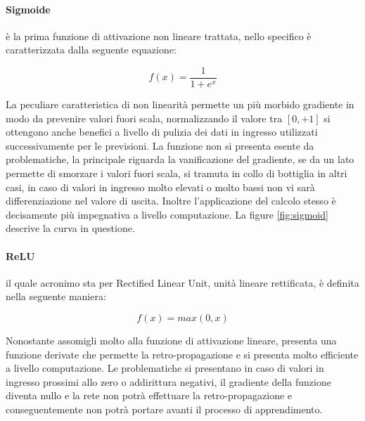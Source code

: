 \documentclass[%
    corpo=12pt,
    twoside,
    oldstyle,
    autoretitolo,
    greek,
    evenboxes,
]{toptesi}
\begin{document}
\paragraph{Sigmoide} è la prima funzione di attivazione non lineare trattata, nello specifico è caratterizzata dalla seguente equazione:
\begin{center}
  \begin{equation}
    f(x) = \frac{1}{1+e^{x}}
  \end{equation}
\end{center}
La peculiare caratteristica di non linearità permette un più morbido gradiente in modo da prevenire valori fuori scala, normalizzando il valore tra $[0, +1]$ si ottengono anche benefici a livello di pulizia dei dati in ingresso utilizzati successivamente per le previsioni. La funzione non si presenta esente da problematiche, la principale riguarda la vanificazione del gradiente, se da un lato permette di smorzare i valori fuori scala, si tramuta in collo di bottiglia in altri casi, in caso di valori in ingresso molto elevati o molto bassi non vi sarà differenziazione nel valore di uscita. Inoltre l'applicazione del calcolo stesso è decisamente più impegnativa a livello computazione. La figure \ref{fig:sigmoid} descrive la curva in questione.

\paragraph{ReLU} il quale acronimo sta per Rectified Linear Unit, unità lineare rettificata, è definita nella seguente maniera:
\begin{center}
  \begin{equation}
    f(x)= max(0, x)
  \end{equation}
\end{center}
Nonostante assomigli molto alla funzione di attivazione lineare, presenta una funzione derivate che permette la retro-propagazione e si presenta molto efficiente a livello computazione. Le problematiche si presentano in caso di valori in ingresso prossimi allo zero o addirittura negativi, il gradiente della funzione diventa nullo e la rete non potrà effettuare la retro-propagazione e conseguentemente non potrà portare avanti il processo di apprendimento.
\end{document}
